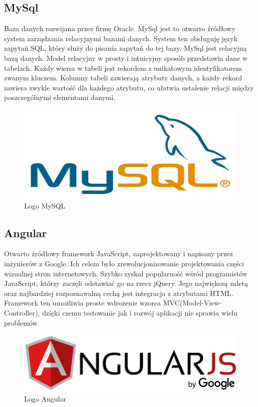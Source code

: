 \documentclass[12pt,a4paper]{article}
\begin{document}
\subsection{MySql} 				%

\hspace*{0.7cm} Baza danych rozwijana przez firmę Oracle. MySql jest to otwarto źródłowy system zarządzania relacyjnymi bazami danych. System ten obsługuję język zapytań SQL, który służy do pisania zapytań do tej bazy. MySql jest relacyjną bazą danych. Model relacyjny w prosty i intuicyjny sposób przedstawia dane w tabelach. Każdy wiersz w tabeli jest rekordem z unikatowym identyfikatorem zwanym kluczem. Kolumny tabeli zawierają atrybuty danych, a każdy rekord zawiera zwykle wartość dla każdego atrybutu, co ułatwia ustalenie relacji między poszczególnymi elementami danymi.\newline
 
\begin{figure}[h]
	\centering
	\includegraphics[width=0.7\linewidth]{mysql-logo}
	\caption{Logo MySQL}
	\label{fig:mysql-logo}
\end{figure}

\newpage
\subsection{Angular} 			%

\hspace*{0.7cm} Otwarto źródłowy framework JavaScript, zaprojektowany i napisany przez inżynierów z Google. Ich celem było zrewolucjonizowanie projektowania części wizualnej stron internetowych. Szybko zyskał popularność wśród programistów JavaScript, którzy zaczęli odstawiać go na rzecz jQuery. Jego największą zaletą oraz najbardziej rozpoznawalną cechą jest integracja z atrybutami HTML. Framework ten umożliwia proste wdrożenie wzorca MVC(Model-View-Controller), dzięki czemu testowanie jak i rozwój aplikacji nie sprawia wielu problemów.

\begin{figure}[h]
	\centering
	\includegraphics[width=0.7\linewidth]{AngularJS_logo}
	\caption{Logo Angular}
	\label{fig:angularjslogo}
\end{figure}
\end{document}
